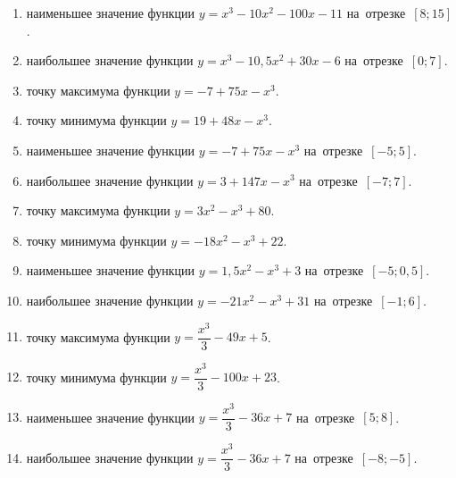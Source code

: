 \documentclass[a4paper,10pt]{article}
\begin{document}
\begin{enumerate}
\item {} наименьшее значение функции $y=x^3 -10x^2-100x-11$ на~отрезке~$\left[8;15\right]$.

\item {} наибольшее значение функции $y=x^3 -10,5x^2+30x-6$ на~отрезке~$\left[0;7\right]$.

\item {} точку максимума функции $y=-7+75x-x^3$.

\item {} точку минимума функции $y=19+48x-x^3$.

\item {} наименьшее значение функции $y=-7+75x-x^3$ на~отрезке~$\left[-5;5\right]$.

\item {} наибольшее значение функции $y=3+147x-x^3$ на~отрезке~$\left[-7;7\right]$.

\item {} точку максимума функции $y=3x^2-x^3+80$.

\item {} точку минимума функции $y=-18x^2-x^3+22$.

\item {} наименьшее значение функции $y=1,5x^2-x^3+3$ на~отрезке~$\left[-5;0,5\right]$.

\item {} наибольшее значение функции $y=-21x^2-x^3+31$ на~отрезке~$\left[-1;6\right]$.

\item {} точку максимума функции $y=\dfrac{x^3}{3} -49x+5$.

\item {} точку минимума функции $y=\dfrac{x^3}{3} -100x+23$.

\item {} наименьшее значение функции $y=\dfrac{x^3}{3} -36x+7$ на~отрезке~$\left[5;8\right]$.







\item {} наибольшее значение функции $y=\dfrac{x^3}{3} -36x+7$ на~отрезке~$\left[-8;-5\right]$.








\end{enumerate}
\end{document}
